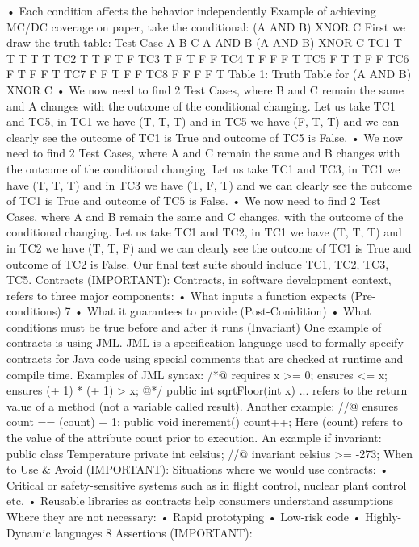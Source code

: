 \documentclass[10pt]{article}
\begin{document}
\begin{multicols}{2}
• Each condition affects the behavior independently
Example of achieving MC/DC coverage on paper, take the conditional:
(A AND B) XNOR C
First we draw the truth table:
Test Case
A
B
C
A AND B
(A AND B) XNOR C
TC1
T
T
T
T
T
TC2
T
T
F
T
F
TC3
T
F
T
F
F
TC4
T
F
F
F
T
TC5
F
T
T
F
F
TC6
F
T
F
F
T
TC7
F
F
T
F
F
TC8
F
F
F
F
T
Table 1: Truth Table for (A AND B) XNOR C
• We now need to find 2 Test Cases, where B and C remain the same and A
changes with the outcome of the conditional changing. Let us take TC1
and TC5, in TC1 we have (T, T, T) and in TC5 we have (F, T, T) and we
can clearly see the outcome of TC1 is True and outcome of TC5 is False.
• We now need to find 2 Test Cases, where A and C remain the same and B
changes with the outcome of the conditional changing. Let us take TC1
and TC3, in TC1 we have (T, T, T) and in TC3 we have (T, F, T) and we
can clearly see the outcome of TC1 is True and outcome of TC5 is False.
• We now need to find 2 Test Cases, where A and B remain the same and C
changes, with the outcome of the conditional changing. Let us take TC1
and TC2, in TC1 we have (T, T, T) and in TC2 we have (T, T, F) and we
can clearly see the outcome of TC1 is True and outcome of TC2 is False.
Our final test suite should include TC1, TC2, TC3, TC5.
Contracts (IMPORTANT):
Contracts, in software development context, refers to three major components:
• What inputs a function expects (Pre-conditions)
7
• What it guarantees to provide (Post-Conidition)
• What conditions must be true before and after it runs (Invariant)
One example of contracts is using JML. JML is a specification language used to
formally specify contracts for Java code using special comments that are checked
at runtime and compile time. Examples of JML syntax:
/*@
requires x >= 0;
ensures \result * \result <= x;
ensures (\result + 1) * (\result + 1) > x;
@*/
public int sqrtFloor(int x) {
...
}
\result refers to the return value of a method (not a variable called result).
Another example:
//@ ensures count == \old(count) + 1;
public void increment() {
count++;
}
Here \old(count) refers to the value of the attribute count prior to execution.
An example if invariant:
public class Temperature {
private int celsius;
//@ invariant celsius >= -273;
}
When to Use & Avoid (IMPORTANT):
Situations where we would use contracts:
• Critical or safety-sensitive systems such as in flight control, nuclear plant
control etc.
• Reusable libraries as contracts help consumers understand assumptions
Where they are not necessary:
• Rapid prototyping
• Low-risk code
• Highly-Dynamic languages
8
Assertions (IMPORTANT):

\end{multicols}
\end{document}
